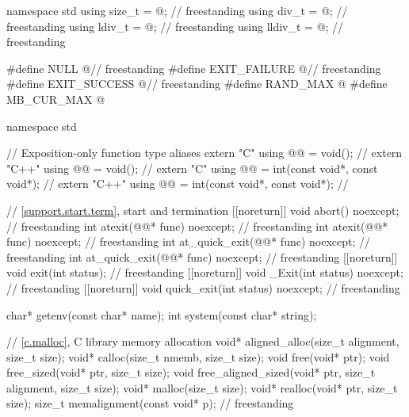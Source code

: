 \begin{codeblock}
namespace std {
  using size_t = @\seebelow@;                                             // freestanding
  using div_t = @\seebelow@;                                              // freestanding
  using ldiv_t = @\seebelow@;                                             // freestanding
  using lldiv_t = @\seebelow@;                                            // freestanding
}

#define NULL @\seebelow@                                                  // freestanding
#define EXIT_FAILURE @\seebelow@                                          // freestanding
#define EXIT_SUCCESS @\seebelow@                                          // freestanding
#define RAND_MAX @\seebelow@
#define MB_CUR_MAX @\seebelow@

namespace std {
  // Exposition-only function type aliases
  extern "C" using @@ = void();                           // \expos
  extern "C++" using @@ = void();                           // \expos
  extern "C" using @@ = int(const void*, const void*);      // \expos
  extern "C++" using @@ = int(const void*, const void*);      // \expos

  // \ref{support.start.term}, start and termination
  [[noreturn]] void abort() noexcept;                                   // freestanding
  int atexit(@@* func) noexcept;                          // freestanding
  int atexit(@@* func) noexcept;                            // freestanding
  int at_quick_exit(@@* func) noexcept;                   // freestanding
  int at_quick_exit(@@* func) noexcept;                     // freestanding
  [[noreturn]] void exit(int status);                                   // freestanding
  [[noreturn]] void _Exit(int status) noexcept;                         // freestanding
  [[noreturn]] void quick_exit(int status) noexcept;                    // freestanding

  char* getenv(const char* name);
  int system(const char* string);

  // \ref{c.malloc}, C library memory allocation
  void* aligned_alloc(size_t alignment, size_t size);
  void* calloc(size_t nmemb, size_t size);
  void free(void* ptr);
  void free_sized(void* ptr, size_t size);
  void free_aligned_sized(void* ptr, size_t alignment, size_t size);
  void* malloc(size_t size);
  void* realloc(void* ptr, size_t size);
  size_t memalignment(const void* p);                                   // freestanding

}
\end{codeblock}

